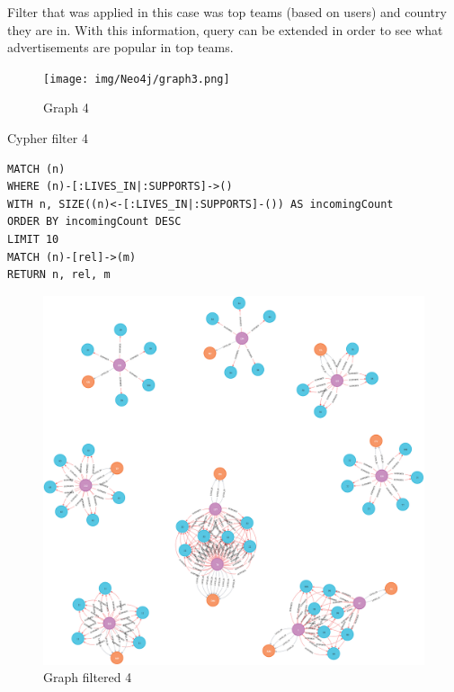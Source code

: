 Filter that was applied in this case was top teams (based on users) and country they are in. With this information, query can be extended in order to see what advertisements are popular in top teams.
\begin{landscape}
    \begin{figure}[H]
        \texttt{[image: img/Neo4j/graph3.png]}
        \centering
        \caption{Graph 4}
        \label{fig:graph3}
    \end{figure}
\end{landscape}

\begin{listing}[H]
\caption{Cypher filter 4}
\begin{verbatim}
MATCH (n)
WHERE (n)-[:LIVES_IN|:SUPPORTS]->()
WITH n, SIZE((n)<-[:LIVES_IN|:SUPPORTS]-()) AS incomingCount
ORDER BY incomingCount DESC
LIMIT 10
MATCH (n)-[rel]->(m)
RETURN n, rel, m
\end{verbatim}
\end{listing}

\begin{landscape}
  \begin{figure}[H]
    \includegraphics[scale=0.25]{img/Neo4j/graph3-filter.png}
    \centering
    \caption{Graph filtered 4}
    \label{fig:graph0}
  \end{figure}
\end{landscape}